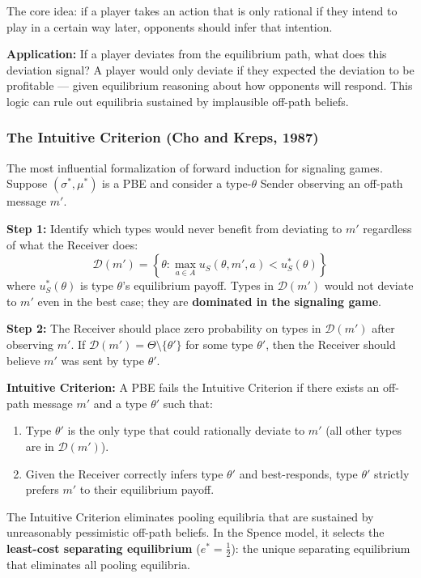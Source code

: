 \documentclass[hidelinks]{article}
\begin{document}
The core idea: if a player takes an action that is only rational if they intend to play in a certain way later, opponents should infer that intention.

\textbf{Application:} If a player deviates from the equilibrium path, what does this deviation signal? A player would only deviate if they expected the deviation to be profitable — given equilibrium reasoning about how opponents will respond. This logic can rule out equilibria sustained by implausible off-path beliefs.

\subsubsection{The Intuitive Criterion (Cho and Kreps, 1987)}

The most influential formalization of forward induction for signaling games. Suppose $(\sigma^*, \mu^*)$ is a PBE and consider a type-$\theta$ Sender observing an off-path message $m'$.

\textbf{Step 1:} Identify which types would never benefit from deviating to $m'$ regardless of what the Receiver does:
\[
\mathcal{D}(m') = \left\{\theta : \max_{a \in A} u_S(\theta, m', a) < u_S^*(\theta)\right\}
\]
where $u_S^*(\theta)$ is type $\theta$'s equilibrium payoff. Types in $\mathcal{D}(m')$ would not deviate to $m'$ even in the best case; they are \textbf{dominated in the signaling game}.

\textbf{Step 2:} The Receiver should place zero probability on types in $\mathcal{D}(m')$ after observing $m'$. If $\mathcal{D}(m') = \Theta \setminus \{\theta'\}$ for some type $\theta'$, then the Receiver should believe $m'$ was sent by type $\theta'$.

\textbf{Intuitive Criterion:} A PBE fails the Intuitive Criterion if there exists an off-path message $m'$ and a type $\theta'$ such that:
\begin{enumerate}
    \item Type $\theta'$ is the only type that could rationally deviate to $m'$ (all other types are in $\mathcal{D}(m')$).
    \item Given the Receiver correctly infers type $\theta'$ and best-responds, type $\theta'$ strictly prefers $m'$ to their equilibrium payoff.
\end{enumerate}

The Intuitive Criterion eliminates pooling equilibria that are sustained by unreasonably pessimistic off-path beliefs. In the Spence model, it selects the \textbf{least-cost separating equilibrium} ($e^* = \frac{1}{2}$): the unique separating equilibrium that eliminates all pooling equilibria.
\end{document}
